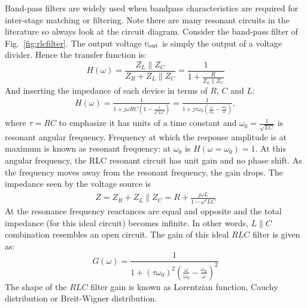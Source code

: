 \documentclass[12pt,oneside]{book}
\begin{document}
Band-pass filters are widely used when bandpass characteristics are required for inter-stage matching or filtering. Note there are many resonant circuits in the literature so always look  at the circuit diagram. Consider the band-pass filter of Fig.~\ref{fig:rlcfilter}.  The output voltage $v_{\rm out}$ is simply the output of a voltage divider. Hence  the transfer function is:
\begin{displaymath}
H(\omega) = \frac{Z_L\parallel Z_C}{Z_R + Z_L\parallel Z_C}=\frac{1}{1+\frac{R}{Z_L \parallel Z_C}}
\end{displaymath}
And inserting the impedance of each device in terms of $R$, $C$ and $L$:
\begin{eqnarray*}
 H(\omega) = \frac{1}{1+j \omega RC(1-\frac{1}{\omega^2 LC})} = \frac{1}{1+j \tau \omega_0 (\frac{\omega}{\omega_0}-\frac{\omega_0}{\omega})},
\end{eqnarray*}
where $\tau=RC$ to emphasize it has units of a time constant and  $\omega_0 = \frac{1}{\sqrt{LC}} $ is resonant angular frequency. Frequency at which the response amplitude is at  maximum is known as resonant frequency:  at $\omega_0$ is $ H(\omega=\omega_0)=1$. At this angular frequency, the RLC resonant circuit has unit gain and no phase shift.  As the frequency moves away from the resonant frequency, the gain drops. The impedance seen by the voltage source is 
\begin{eqnarray*}
 Z =Z_R + Z_L\parallel Z_C = R+\frac{j\omega L}{1-\omega^2 LC}
\end{eqnarray*}
At the resonance frequency  reactances are equal and opposite and the  total impedance (for this ideal circuit) becomes infinite. In other words, $L\parallel C$ combination resembles an open circuit.  The gain of this ideal $RLC$ filter is given as:
\begin{displaymath}
G(\omega) = \frac{1}{1+ (\tau \omega_0)^2 (\frac{\omega}{\omega_0}-\frac{\omega_0}{\omega})^2}
\end{displaymath}
The shape of the $RLC$ filter gain  is known as Lorentzian function, Cauchy distribution or Breit-Wigner distribution.
\end{document}
